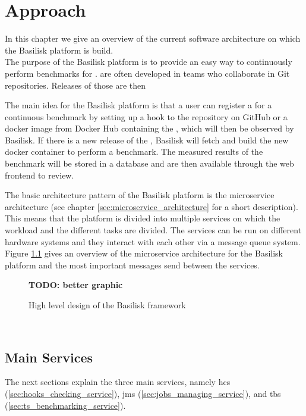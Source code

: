 \chapter{Approach}
\label{ch:approach}

In this chapter we give an overview of the current software architecture on which the Basilisk platform is build.
\\

The purpose of the Basilisk platform is to provide an easy way to continuously perform benchmarks for \tsp{}.
\tsp{} are often developed in teams who collaborate in Git repositories.
Releases of those \tsp{} are then 


The main idea for the Basilisk platform is that a user can register a \ts{} for a continuous benchmark by setting up a hook to the repository on GitHub or a docker image from Docker Hub containing the \ts{}, which will then be observed by Basilisk.
If there is a new release of the \ts{}, Basilisk will fetch and build the new docker container to perform a benchmark.
The measured results of the benchmark will be stored in a database and are then available through the web frontend to review.


The basic architecture pattern of the Basilisk platform is the microservice architecture (see chapter \ref{sec:microservice_architecture} for a short description). 
This means that the platform is divided into multiple services on which the workload and the different tasks are divided.
The services can be run on different hardware systems and they interact with each other via a message queue system.
\\

Figure \ref{fig:basilisk_high_level_design} gives an overview of the microservice architecture for the Basilisk platform and the most important messages send between the services.
\begin{figure}[tbph]
	\centering
	\textbf{TODO: better graphic}
	\caption{High level design of the Basilisk framework}
	\label{fig:basilisk_high_level_design}
\end{figure}
\\

\section{Main Services}
\label{sec:main_services}
The next sections explain the three main services, namely \acl{hcs} (\ref{sec:hooks_checking_service}), \acl{jms} (\ref{sec:jobs_managing_service}), and \acl{tbs} (\ref{sec:ts_benchmarking_service}).

